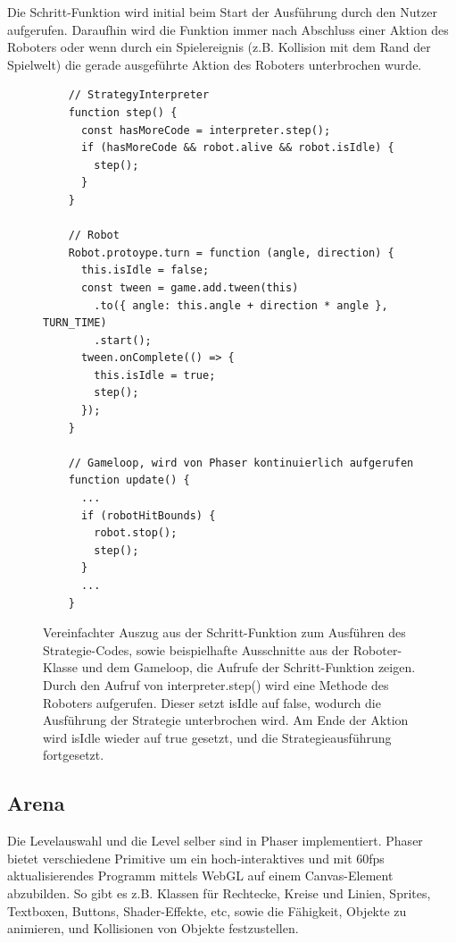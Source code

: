 Die Schritt-Funktion wird initial beim Start der Ausführung durch den Nutzer aufgerufen. Daraufhin
wird die Funktion immer nach Abschluss einer Aktion des Roboters oder wenn durch ein Spielereignis
(z.B. Kollision mit dem Rand der Spielwelt) die gerade ausgeführte Aktion des Roboters unterbrochen
wurde.

\begin{figure}
  \label{interpreter-step}

  \caption{Vereinfachter Auszug aus der Schritt-Funktion zum Ausführen des Strategie-Codes, sowie
  beispielhafte Ausschnitte aus der Roboter-Klasse und dem Gameloop, die Aufrufe der
  Schritt-Funktion zeigen. Durch den Aufruf von interpreter.step() wird eine Methode des Roboters
  aufgerufen. Dieser setzt isIdle auf false, wodurch die Ausführung der Strategie unterbrochen wird.
  Am Ende der Aktion wird isIdle wieder auf true gesetzt, und die Strategieausführung fortgesetzt.}

  \begin{lstlisting}
    // StrategyInterpreter
    function step() {
      const hasMoreCode = interpreter.step();
      if (hasMoreCode && robot.alive && robot.isIdle) {
        step();
      }
    }

    // Robot
    Robot.protoype.turn = function (angle, direction) {
      this.isIdle = false;
      const tween = game.add.tween(this)
        .to({ angle: this.angle + direction * angle }, TURN_TIME)
        .start();
      tween.onComplete(() => {
        this.isIdle = true;
        step();
      });
    }

    // Gameloop, wird von Phaser kontinuierlich aufgerufen
    function update() {
      ...
      if (robotHitBounds) {
        robot.stop();
        step();
      }
      ...
    }
  \end{lstlisting}
\end{figure}


\subsection{Arena}

\label{arena-alt}

Die Levelauswahl und die Level selber sind in Phaser implementiert. Phaser bietet verschiedene
Primitive um ein hoch-interaktives und mit 60fps aktualisierendes Programm mittels WebGL auf einem
Canvas-Element abzubilden. So gibt es z.B. Klassen für Rechtecke, Kreise und Linien, Sprites,
Textboxen, Buttons, Shader-Effekte, etc, sowie die Fähigkeit, Objekte zu animieren, und Kollisionen
von Objekte festzustellen.

